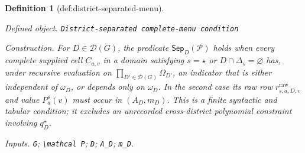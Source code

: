 \documentclass{article}
\newtheorem{definition}{Definition}
\begin{document}
\begin{definition}[def:district-separated-menu]\label{def:district-separated-menu}
\par\smallskip\noindent\emph{Defined object.} \texttt{District-\allowbreak{}separated complete-\allowbreak{}menu condition}
\par\smallskip\noindent\emph{Construction.} For \(D\in\mathcal D(G)\), the predicate \(\mathsf{Sep}_D(\mathcal P)\) holds when every complete supplied cell \(C_{a,v}\) in a domain satisfying \(s=\star\) or \(D\cap\Delta_s=\varnothing\) has, under recursive evaluation on \(\prod_{D'\in\mathcal D(G)}\Omega_{D'}\), an indicator that is either independent of \(\omega_D\), or depends only on \(\omega_D\).  In the second case its raw row \(r^{\mathrm{raw}}_{s,a,D,v}\) and value \(P_a^s(v)\) must occur in \((A_D,m_D)\).  This is a finite syntactic and tabular condition; it excludes an unrecorded cross-district polynomial constraint involving \(q_D^\star\).
\par\smallskip\noindent\emph{Inputs.} \texttt{G}; \texttt{\textbackslash{}\allowbreak{}mathcal P}; \texttt{D}; \texttt{A\_\allowbreak{}D}; \texttt{m\_\allowbreak{}D}.
\end{definition}
\end{document}
